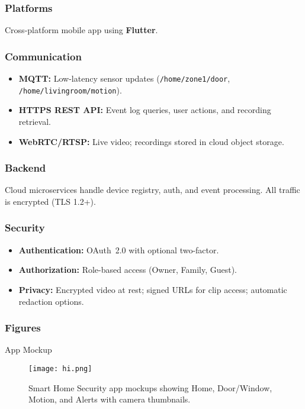 \documentclass[conference]{IEEEtran}
\begin{document}
\subsubsection{Platforms}
Cross-platform mobile app using \textbf{Flutter}.

\subsubsection{Communication}
\begin{itemize}
  \item \textbf{MQTT:} Low-latency sensor updates (\texttt{/home/zone1/door}, \texttt{/home/livingroom/motion}).
  \item \textbf{HTTPS REST API:} Event log queries, user actions, and recording retrieval.
  \item \textbf{WebRTC/RTSP:} Live video; recordings stored in cloud object storage.
\end{itemize}

\subsubsection{Backend}
Cloud microservices handle device registry, auth, and event processing. All traffic is encrypted (TLS 1.2+).

\subsubsection{Security}
\begin{itemize}
  \item \textbf{Authentication:} OAuth~2.0 with optional two-factor.
  \item \textbf{Authorization:} Role-based access (Owner, Family, Guest).
  \item \textbf{Privacy:} Encrypted video at rest; signed URLs for clip access; automatic redaction options.
\end{itemize}

\subsubsection{Figures}
App Mockup
\begin{figure}[h]
  \centering
  \texttt{[image: hi.png]}
  \caption{Smart Home Security app mockups showing Home, Door/Window, Motion, and Alerts with camera thumbnails.}
\end{figure}
\end{document}
